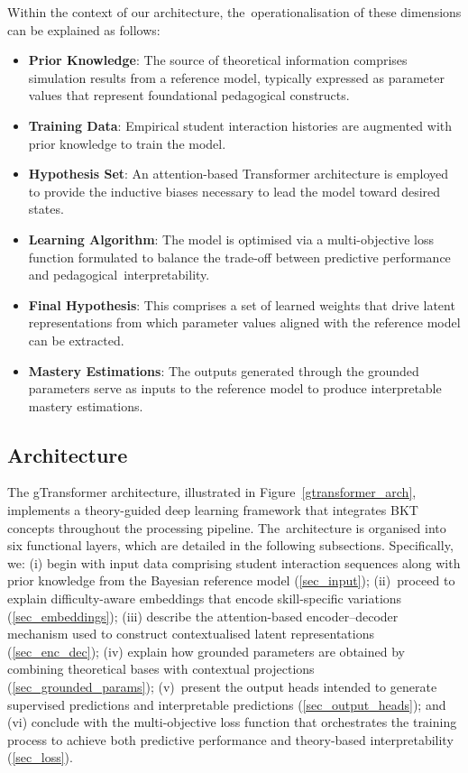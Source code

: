 \documentclass[applsci,article,accept,moreauthors,pdftex]{Definitions/mdpi}
\begin{document}
Within the context of our architecture, the~{operationalisation} of these dimensions can be explained as follows: 

\begin{itemize}
    \item \textbf{Prior Knowledge}: The source of theoretical information comprises simulation results from a reference model, typically expressed as parameter values that represent foundational pedagogical constructs.
    \item \textbf{Training Data}: Empirical student interaction histories are augmented with prior knowledge to train the model.
    \item \textbf{Hypothesis Set}: An attention-based Transformer architecture is employed to provide the inductive biases necessary to lead the model toward desired states.
    \item \textbf{Learning Algorithm}: The model is {optimised} via a multi-objective loss function formulated to balance the trade-off between predictive performance and pedagogical~interpretability.
    \item \textbf{Final Hypothesis}: This comprises a set of learned weights that drive latent representations from which parameter values aligned with the reference model can be extracted. %
    \item \textbf{Mastery Estimations}: The outputs generated through the grounded parameters serve as inputs to the reference model to produce interpretable mastery estimations.
\end{itemize}


\subsection{Architecture}

The gTransformer architecture, illustrated in Figure~\ref{gtransformer_arch}, implements a theory-guided deep learning framework that integrates BKT concepts throughout the processing pipeline. The~architecture is {organised} into six functional layers, which are detailed in the following subsections. Specifically, we: (i) begin with input data comprising student interaction sequences along with prior knowledge from the Bayesian reference model (\mbox{\cref{sec_input}}); (ii)~proceed to explain difficulty-aware embeddings that encode skill-specific variations (\mbox{\cref{sec_embeddings}}); (iii) describe the attention-based encoder--decoder mechanism used to construct {contextualised} latent representations (\cref{sec_enc_dec}); (iv) explain how grounded parameters are obtained by combining theoretical bases with contextual projections (\mbox{\cref{sec_grounded_params}}); (v)~present the output heads intended to generate supervised predictions and interpretable predictions (\cref{sec_output_heads}); and (vi) conclude with the multi-objective loss function that orchestrates the training process to achieve both predictive performance and theory-based interpretability (\cref{sec_loss}).
\end{document}
